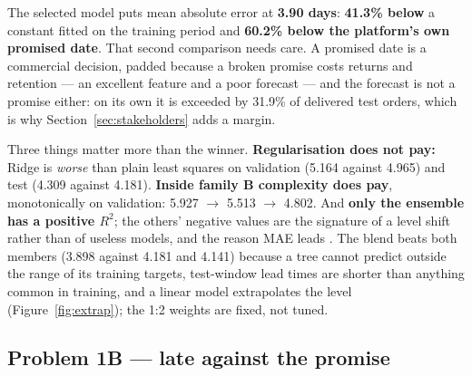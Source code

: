 The selected model puts mean absolute error at \textbf{3.90 days}: \textbf{41.3\%
below} a constant fitted on the training period and \textbf{60.2\% below the
platform's own promised date}. That second comparison needs care. A promised
date is a commercial decision, padded because a broken promise costs returns and
retention \citep{cui2024promise} --- an excellent feature and a poor forecast ---
and the forecast is not a promise either: on its own it is exceeded by 31.9\%
of delivered test orders, which is why Section~\ref{sec:stakeholders} adds a
margin.

Three things matter more than the winner. \textbf{Regularisation does not pay:}
Ridge is \emph{worse} than plain least squares on validation (5.164 against
4.965) and test (4.309 against 4.181). \textbf{Inside family B complexity does
pay}, monotonically on validation: 5.927 $\rightarrow$ 5.513 $\rightarrow$ 4.802.
And \textbf{only the ensemble has a positive $R^2$}; the others' negative values
are the signature of a level shift rather than of useless models, and the reason
MAE leads \citep{hyndman2006accuracy}. The blend beats both members (3.898
against 4.181 and 4.141) because a tree cannot predict outside the range of its
training targets, test-window lead times are shorter than anything common in
training, and a linear model extrapolates the level (Figure~\ref{fig:extrap});
the 1:2 weights are fixed, not tuned.

\subsection{Problem 1B --- late against the promise}
\label{sec:results-late}

\begin{table}[htbp]
\centering
\caption{The late-order flag, best of each route; the full seven-candidate table
is in . No-skill PR-AUC floor 0.074.
Figure~\ref{fig:routes}.}
\label{tab:late}
\footnotesize
{\setlength{\tabcolsep}{3pt}
}
\end{table}

